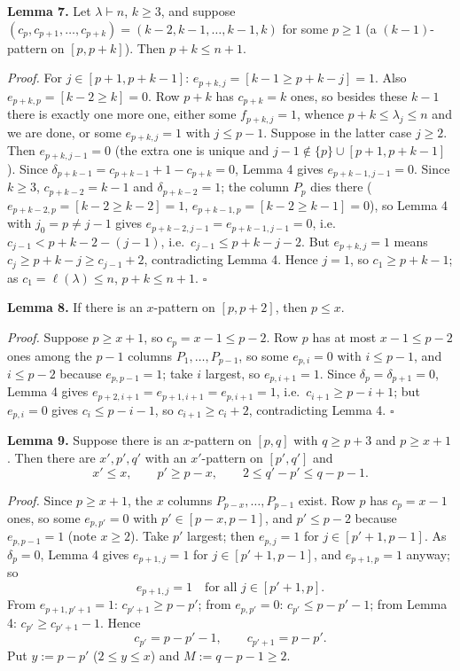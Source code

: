 \textbf{Lemma 7.} Let \(\lambda\vdash n\), \(k\ge3\), and suppose
\((c_p,c_{p+1},\dots,c_{p+k})=(k-2,k-1,\dots,k-1,k)\) for some \(p\ge1\)
(a \((k-1)\)-pattern on \([p,p+k]\)). Then \(p+k\le n+1\).

\emph{Proof.} For \(j\in[p+1,p+k-1]\): \(e_{p+k,j}=[k-1\ge p+k-j]=1\).
Also \(e_{p+k,p}=[k-2\ge k]=0\). Row \(p+k\) has \(c_{p+k}=k\) ones, so
besides these \(k-1\) there is exactly one more one, either some
\(f_{p+k,j}=1\), whence \(p+k\le\lambda_j\le n\) and we are done, or
some \(e_{p+k,j}=1\) with \(j\le p-1\). Suppose in the latter case
\(j\ge2\). Then \(e_{p+k,j-1}=0\) (the extra one is unique and
\(j-1\notin\{p\}\cup[p+1,p+k-1]\)). Since
\(\delta_{p+k-1}=c_{p+k-1}+1-c_{p+k}=0\), Lemma 4 gives
\(e_{p+k-1,j-1}=0\). Since \(k\ge3\), \(c_{p+k-2}=k-1\) and
\(\delta_{p+k-2}=1\); the column \(P_p\) dies there
(\(e_{p+k-2,p}=[k-2\ge k-2]=1\), \(e_{p+k-1,p}=[k-2\ge k-1]=0\)), so
Lemma 4 with \(j_0=p\ne j-1\) gives \(e_{p+k-2,j-1}=e_{p+k-1,j-1}=0\),
i.e.~\(c_{j-1}<p+k-2-(j-1)\), i.e.~\(c_{j-1}\le p+k-j-2\). But
\(e_{p+k,j}=1\) means \(c_j\ge p+k-j\ge c_{j-1}+2\), contradicting Lemma
4. Hence \(j=1\), so \(c_1\ge p+k-1\); as \(c_1=\ell(\lambda)\le n\),
\(p+k\le n+1\). \(\square\)

\textbf{Lemma 8.} If there is an \(x\)-pattern on \([p,p+2]\), then
\(p\le x\).

\emph{Proof.} Suppose \(p\ge x+1\), so \(c_p=x-1\le p-2\). Row \(p\) has
at most \(x-1\le p-2\) ones among the \(p-1\) columns
\(P_1,\dots,P_{p-1}\), so some \(e_{p,i}=0\) with \(i\le p-1\), and
\(i\le p-2\) because \(e_{p,p-1}=1\); take \(i\) largest, so
\(e_{p,i+1}=1\). Since \(\delta_p=\delta_{p+1}=0\), Lemma 4 gives
\(e_{p+2,i+1}=e_{p+1,i+1}=e_{p,i+1}=1\), i.e.~\(c_{i+1}\ge p-i+1\); but
\(e_{p,i}=0\) gives \(c_i\le p-i-1\), so \(c_{i+1}\ge c_i+2\),
contradicting Lemma 4. \(\square\)

\textbf{Lemma 9.} Suppose there is an \(x\)-pattern on \([p,q]\) with
\(q\ge p+3\) and \(p\ge x+1\). Then there are \(x',p',q'\) with an
\(x'\)-pattern on \([p',q']\) and
\[x'\le x,\qquad p'\ge p-x,\qquad 2\le q'-p'\le q-p-1.\]

\emph{Proof.} Since \(p\ge x+1\), the \(x\) columns
\(P_{p-x},\dots,P_{p-1}\) exist. Row \(p\) has \(c_p=x-1\) ones, so some
\(e_{p,p'}=0\) with \(p'\in[p-x,p-1]\), and \(p'\le p-2\) because
\(e_{p,p-1}=1\) (note \(x\ge2\)). Take \(p'\) largest; then
\(e_{p,j}=1\) for \(j\in[p'+1,p-1]\). As \(\delta_p=0\), Lemma 4 gives
\(e_{p+1,j}=1\) for \(j\in[p'+1,p-1]\), and \(e_{p+1,p}=1\) anyway; so
\[e_{p+1,j}=1\quad\text{for all }j\in[p'+1,p].\tag{9.1}\] From
\(e_{p+1,p'+1}=1\): \(c_{p'+1}\ge p-p'\); from \(e_{p,p'}=0\):
\(c_{p'}\le p-p'-1\); from Lemma 4: \(c_{p'}\ge c_{p'+1}-1\). Hence
\[c_{p'}=p-p'-1,\qquad c_{p'+1}=p-p'.\tag{9.2}\] Put \(y:=p-p'\)
(\(2\le y\le x\)) and \(M:=q-p-1\ge2\).

